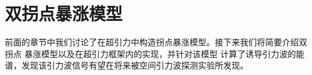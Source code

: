 \chapter{双拐点暴涨模型}

前面的章节中我们讨论了在超引力中构造拐点暴涨模型。接下来我们将简要介绍双拐点
暴涨模型以及在超引力框架内的实现，并针对该模型
计算了诱导引力波的能谱，发现该引力波信号有望在将来被空间引力波探测实验所发现。



% 



